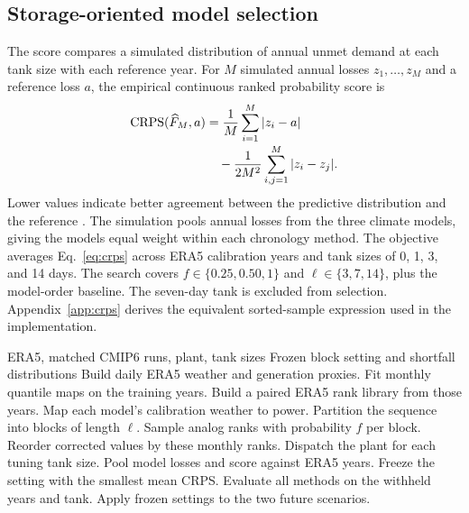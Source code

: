 \subsection{Storage-oriented model selection}
The score compares a simulated distribution of annual unmet demand at each tank size with each reference year. For $M$ simulated annual losses $z_1,\ldots,z_M$ and a reference loss $a$, the empirical continuous ranked probability score is
\begin{equation}
\label{eq:crps}
\begin{aligned}
\operatorname{CRPS}(\widehat F_M,a)
&=\frac{1}{M}\sum_{i=1}^{M}|z_i-a|\\[-2pt]
&\quad{}-\frac{1}{2M^2}\sum_{i,j=1}^{M}|z_i-z_j|.
\end{aligned}
\end{equation}
Lower values indicate better agreement between the predictive distribution and the reference \citep{gneiting2007}. The simulation pools annual losses from the three climate models, giving the models equal weight within each chronology method. The objective averages Eq.~\eqref{eq:crps} across ERA5 calibration years and tank sizes of 0, 1, 3, and 14 days. The search covers $f\in\{0.25,0.50,1\}$ and $\ell\in\{3,7,14\}$, plus the model-order baseline. The seven-day tank is excluded from selection. Appendix~\ref{app:crps} derives the equivalent sorted-sample expression used in the implementation.

\begin{algorithm}[t]
\caption{Fit and test the weather chronology}
\label{alg:pipeline}
\small
\begin{algorithmic}[1]
\Require ERA5, matched CMIP6 runs, plant, tank sizes
\Ensure Frozen block setting and shortfall distributions
\State Build daily ERA5 weather and generation proxies.
\State Fit monthly quantile maps on the training years.
\State Build a paired ERA5 rank library from those years.
\State Map each model's calibration weather to power.
    \State Partition the sequence into blocks of length $\ell$.
    \State Sample analog ranks with probability $f$ per block.
    \State Reorder corrected values by these monthly ranks.
    \State Dispatch the plant for each tuning tank size.
  \EndFor
  \State Pool model losses and score against ERA5 years.
\EndFor
\State Freeze the setting with the smallest mean CRPS.
\State Evaluate all methods on the withheld years and tank.
\State Apply frozen settings to the two future scenarios.
\end{algorithmic}
\end{algorithm}

